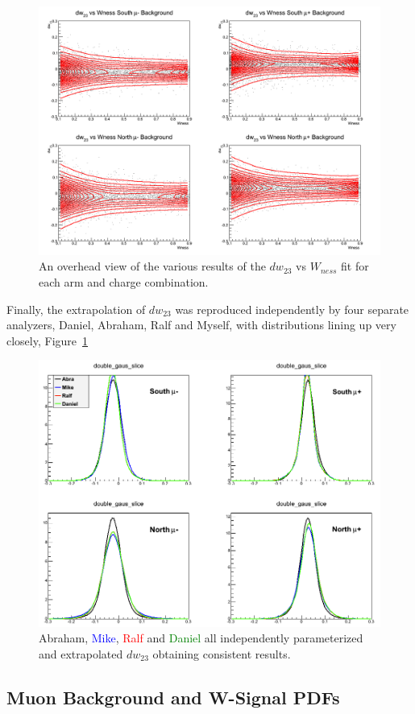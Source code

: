 \begin{figure}
  \centering
  \includegraphics[width=\linewidth]{./figures/c_WnessVsdw23.png}
  \caption{
    An overhead view of the various results of the $dw_{23}$ vs $W_{ness}$ fit
    for each arm and charge combination.
  }
\end{figure}

Finally, the extrapolation of $dw_{23}$ was reproduced independently by four
separate analyzers, Daniel, Abraham, Ralf and Myself, with distributions lining
up very closely, Figure~\ref{fig:four_dw23}

\begin{figure}
  \centering
  \includegraphics[width=0.7\linewidth]{./figures/dw23_fourway.png}
  \caption{
    Abraham, \textcolor{blue}{Mike}, \textcolor{red}{Ralf} and
    \textcolor{green}{Daniel} all independently parameterized and extrapolated
    $dw_{23}$ obtaining consistent results.
  }
  \label{fig:four_dw23}
\end{figure}


\clearpage
\subsection{Muon Background and W-Signal PDFs}
